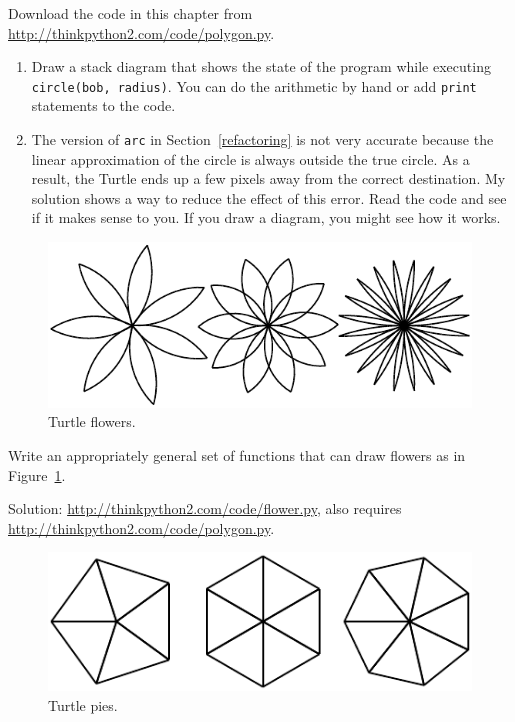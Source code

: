 \documentclass[10pt]{book}
\begin{document}
\begin{exercise}

Download the code in this chapter from
\url{http://thinkpython2.com/code/polygon.py}.

\begin{enumerate}

\item Draw a stack diagram that shows the state of the program
while executing {\tt circle(bob, radius)}.  You can do the
arithmetic by hand or add {\tt print} statements to the code.

\item The version of {\tt arc} in Section~\ref{refactoring} is not
very accurate because the linear approximation of the
circle is always outside the true circle.  As a result,
the Turtle ends up a few pixels away from the correct
destination.  My solution shows a way to reduce
the effect of this error.  Read the code and see if it makes
sense to you.  If you draw a diagram, you might see how it works.

\end{enumerate}

\end{exercise}

\begin{figure}
\centerline
{\includegraphics[scale=0.8]{figs/flowers.pdf}}
\caption{Turtle flowers.}
\label{fig.flowers}
\end{figure}

\begin{exercise}

Write an appropriately general set of functions that
can draw flowers as in Figure~\ref{fig.flowers}.

Solution: \url{http://thinkpython2.com/code/flower.py},
also requires \url{http://thinkpython2.com/code/polygon.py}.

\end{exercise}

\begin{figure}
\centerline
{\includegraphics[scale=0.8]{figs/pies.pdf}}
\caption{Turtle pies.}
\label{fig.pies}
\end{figure}
\end{document}
